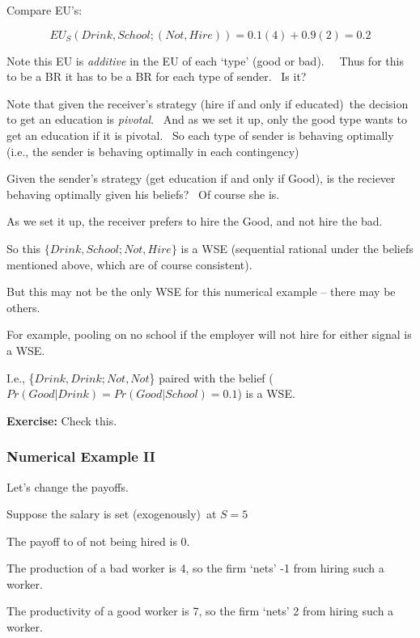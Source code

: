 \documentclass{article}
\begin{document}
\bigskip

Compare EU's:

\[
EU_{S}(Drink,School;(Not,Hire))=0.1(4)+0.9(2)=0.2 
\]

Note this EU is \textit{additive} in the EU of each `type' (good or bad). \
\ Thus for this to be a BR it has to be a BR for each type of sender. \ Is
it?

\bigskip

Note that given the receiver's strategy (hire if and only if educated)\ the
decision to get an education is \textit{pivotal}. \ And as we set it up,
only the good type wants to get an education if it is pivotal. \ So each
type of sender is behaving optimally (i.e., the sender is behaving optimally
in each contingency)

\bigskip

Given the sender's strategy (get education if and only if Good), is the
reciever behaving optimally given his beliefs? \ Of course she is. \ 

As we set it up, the receiver prefers to hire the Good, and not hire the
bad. \ 

So this $\{Drink,School;Not,Hire\}$ is a WSE (sequential rational under the
beliefs mentioned above, which are of course consistent).

\bigskip

But this may not be the only WSE for this numerical example -- there may be
others. \ 

For example, pooling on no school if the employer will not hire for either
signal is a WSE.

I.e., \{$Drink,Drink;Not,Not$\} paired with the belief ($%
Pr(Good|Drink)=Pr(Good|School)=0.1$) is a WSE.

\textbf{Exercise: }Check this.

\pagebreak \bigskip

\subsubsection{Numerical Example II}

Let's change the payoffs.

Suppose the salary is set (exogenously)\ at $S=5$

The payoff to of not being hired is $0.$

The production of a bad worker is 4, so the firm `nets' -1 from hiring such
a worker.

The productivity of a good worker is 7, so the firm `nets' 2 from hiring
such a worker.
\end{document}
